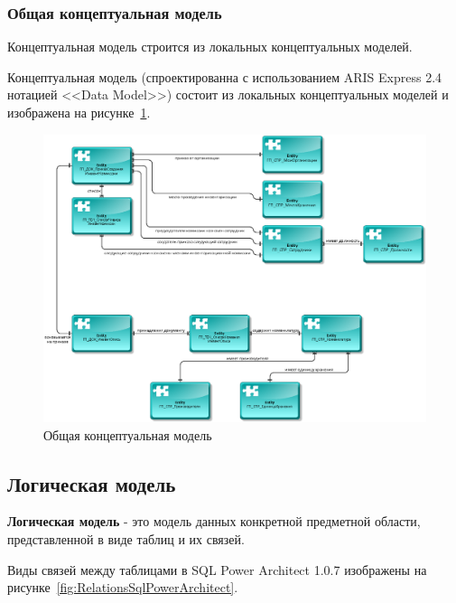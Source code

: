 \subsubsection*{Общая концептуальная модель}

Концептуальная модель строится из локальных концептуальных моделей.

Концептуальная модель
(спроектированна с использованием ARIS Express 2.4 \cite{ArisExpress} нотацией <<Data Model>>)
состоит из локальных концептуальных моделей и
изображена на рисунке~\ref{fig:GeneralConceptualModel}.

\begin{figure}[!h]
    \centering

    \includegraphics[width=18cm]
    {assets/ARIS/DataModel/GeneralConceptualModel/GeneralConceptualModel.png}

    \caption{Общая концептуальная модель}

    \label{fig:GeneralConceptualModel}
\end{figure}

\subsection{Логическая модель}

\textbf{Логическая модель} - это модель данных конкретной предметной области,
представленной в виде таблиц и их связей.

Виды связей между таблицами в SQL Power Architect 1.0.7 \cite{SqlPowerArhitect}
изображены на рисунке~\ref{fig:RelationsSqlPowerArchitect}.

